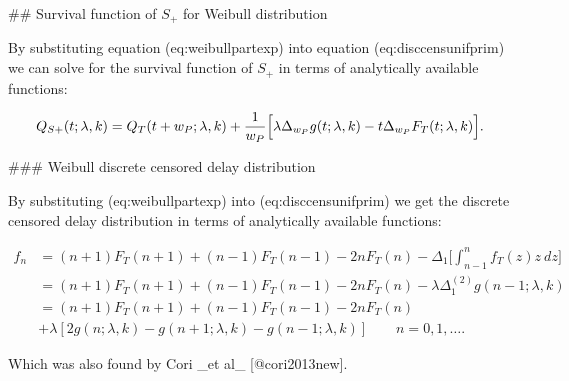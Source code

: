 \documentclass[10pt,letterpaper]{article}
\begin{document}
## Survival function of $S_{+}$ for Weibull distribution

By substituting equation \@ref(eq:weibullpartexp) into equation \@ref(eq:disccensunifprim) we can solve for the survival function of $S_+$ in terms of analytically available functions:

$$
Q_{S+}(t ;\lambda,k) = Q_T(t + w_P; \lambda,k) + { 1 \over w_P} \Big[ \lambda \Delta_{w_P} g(t; \lambda,k) - t\Delta_{w_P}F_T(t; \lambda,k)\Big].
$$

### Weibull discrete censored delay distribution

By substituting \@ref(eq:weibullpartexp) into \@ref(eq:disccensunifprim) we get the discrete censored delay distribution in terms of analytically available functions:

$$
\begin{aligned}
f_n &= (n+1)F_T(n+1)  + (n-1)F_T(n-1) - 2nF_T(n) - \Delta_1\Big[ \int_{n-1}^n f_T(z) z ~dz \Big] \\
&= (n+1)F_T(n+1)  + (n-1)F_T(n-1) - 2nF_T(n) - \lambda \Delta_1^{(2)} g(n-1; \lambda,k) \\
&= (n+1)F_T(n+1)  + (n-1)F_T(n-1) - 2nF_T(n) \\
&+ \lambda [2 g(n; \lambda,k) - g(n+1; \lambda,k) - g(n-1; \lambda,k)] \qquad n = 0, 1, \dots.
\end{aligned}
$$

Which was also found by Cori _et al_ [@cori2013new].
\end{document}
